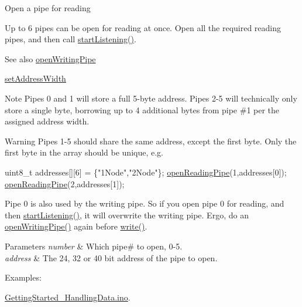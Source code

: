 Open a pipe for reading

Up to 6 pipes can be open for reading at once. Open all the required reading pipes, and then call \hyperlink{classRF24_a30a2733a3889bdc331fe2d2f4f0f7b39}{start\+Listening()}.

\begin{DoxySeeAlso}{See also}
\hyperlink{classRF24_af2e409e62d49a23e372a70b904ae30e1}{open\+Writing\+Pipe} 

\hyperlink{classRF24_ad5aea7f9a3bd9c7d357fb296ce751f21}{set\+Address\+Width}
\end{DoxySeeAlso}
\begin{DoxyNote}{Note}
Pipes 0 and 1 will store a full 5-\/byte address. Pipes 2-\/5 will technically only store a single byte, borrowing up to 4 additional bytes from pipe \#1 per the assigned address width. 
\end{DoxyNote}
\begin{DoxyWarning}{Warning}
Pipes 1-\/5 should share the same address, except the first byte. Only the first byte in the array should be unique, e.\+g. 
\begin{DoxyCode}
uint8\_t addresses[][6] = \{\textcolor{stringliteral}{"1Node"},\textcolor{stringliteral}{"2Node"}\};
\hyperlink{classRF24_a9edc910ccc1ffcff56814b08faca5535}{openReadingPipe}(1,addresses[0]);
\hyperlink{classRF24_a9edc910ccc1ffcff56814b08faca5535}{openReadingPipe}(2,addresses[1]);
\end{DoxyCode}


Pipe 0 is also used by the writing pipe. So if you open pipe 0 for reading, and then \hyperlink{classRF24_a30a2733a3889bdc331fe2d2f4f0f7b39}{start\+Listening()}, it will overwrite the writing pipe. Ergo, do an \hyperlink{classRF24_af2e409e62d49a23e372a70b904ae30e1}{open\+Writing\+Pipe()} again before \hyperlink{classRF24_a4cd4c198a47704db20b6b5cf0731cd58}{write()}.
\end{DoxyWarning}

\begin{DoxyParams}{Parameters}
{\em number} & Which pipe\# to open, 0-\/5. \\
\hline
{\em address} & The 24, 32 or 40 bit address of the pipe to open. \\
\hline
\end{DoxyParams}
\begin{Desc}
\item[Examples\+: ]\par
\hyperlink{GettingStarted_HandlingData_8ino-example}{Getting\+Started\+\_\+\+Handling\+Data.\+ino}.\end{Desc}


